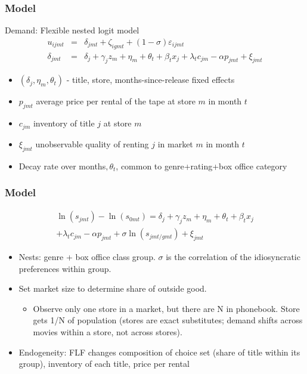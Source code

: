 \begin{frame}
\frametitle{Model}

Demand: Flexible nested logit model%
\begin{eqnarray*}
u_{ijmt} &=&\delta _{jmt}+\zeta _{igmt}+(1-\sigma )\varepsilon _{ijmt} \\
\delta _{jmt} &=&\delta _{j}+\gamma _{j}z_{m}+\eta _{m}+\theta _{t}+\beta
_{t}x_{j}+\lambda _{t}c_{jm}-\alpha p_{jmt}+\xi _{jmt}
\end{eqnarray*}

\begin{itemize}
\item $(\delta _{j},\eta _{m},\theta _{t})$ - title, store,
months-since-release fixed effects

\item $p_{jmt}$ average price per rental of the tape at store $m$ in month $%
t $

\item $c_{jm}$ inventory of title $j$ at store $m$

\item $\xi _{jmt}$ unobservable quality of renting $j$ in market $m$ in
month $t$

\item Decay rate over months$,\theta _{t}$, common to genre+rating+box
office category
\end{itemize}
\end{frame}


\begin{frame}
\frametitle{Model}%
\begin{eqnarray*}
\ln (s_{jmt}) -\ln (s_{0mt})=\delta _{j}+\gamma _{j}z_{m}+\eta _{m}+\theta
_{t}+\beta _{t}x_{j} \\
+ \lambda _{t}c_{jm}-\alpha p_{jmt}+\sigma \ln (s_{jmt/gmt})+\xi _{jmt}
\end{eqnarray*}

\begin{itemize}
\item Nests: genre + box office class group. $\sigma $ is the correlation of
the idiosyncratic preferences within group.

\item Set market size to determine share of outside good.

\begin{itemize}
\item Observe only one store in a market, but there are N in phonebook.
Store gets 1/N of population (stores are exact substitutes; demand
shifts across movies within a store, not across stores).
\end{itemize}

\item Endogeneity: FLF changes composition of choice set (share of title
within its group), inventory of each title, price per rental
\end{itemize}
\end{frame}


